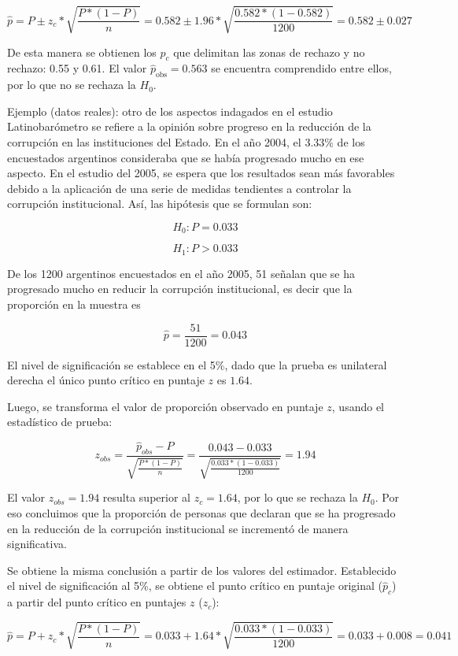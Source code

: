 \documentclass[]{book}
\begin{document}
\[\widehat{p} = P \pm z_{c}*\sqrt{\frac{P*(1 - P)}{n}} = 0.582 \pm 1.96*\sqrt{\frac{0.582*(1 - 0.582)}{1200}} = 0.582 \pm 0.027\]

De esta manera se obtienen los \({\widehat{p}}_{c}\) que delimitan las
zonas de rechazo y no rechazo: 0.55 y 0.61. El valor
\({\widehat{p}}_{\text{obs}} = 0.563\) se encuentra comprendido entre
ellos, por lo que no se rechaza la \(H_{0}\).

Ejemplo (datos reales): otro de los aspectos indagados en el estudio
Latinobarómetro se refiere a la opinión sobre progreso en la reducción de la corrupción
en las instituciones del Estado. En el año 2004, el 3.33\% de los
encuestados argentinos consideraba que se había progresado mucho en ese
aspecto. En el estudio del 2005, se espera que los resultados sean más
favorables debido a la aplicación de una serie de medidas tendientes a
controlar la corrupción institucional. Así, las hipótesis que se
formulan son:

\[H_{0}:P = 0.033\]

\[H_{1}:P > 0.033\]

De los 1200 argentinos encuestados en el año 2005, 51 señalan que se ha
progresado mucho en reducir la corrupción institucional, es decir que la
proporción en la muestra es

\[\widehat{p} = \frac{51}{1200} = 0.043\]

El nivel de significación se establece en el 5\%, dado que la prueba es
unilateral derecha el único punto crítico en puntaje \(z\) es \(1.64\).

Luego, se transforma el valor de proporción observado en puntaje \(z\),
usando el estadístico de prueba:

\[z_{obs} = \frac{{\widehat{p}}_{obs} - P}{\sqrt{\frac{P*(1 - P)}{n}}} = \frac{0.043 - 0.033}{\sqrt{\frac{0.033*(1 - 0.033)}{1200}}} = 1.94\]

El valor \(z_{obs}=1.94\) resulta superior al \(z_{c}=1.64\), por lo que
se rechaza la \(H_0\). Por eso concluimos que la proporción de personas que
declaran que se ha progresado en la reducción de la corrupción
institucional se incrementó de manera significativa.

Se obtiene la misma conclusión a partir de los valores del estimador.
Establecido el nivel de significación al 5\%, se obtiene el punto crítico
en puntaje original (\({\widehat{p}}_{c}\)) a partir del punto crítico en
puntajes \(z\) (\(z_{c}\)):

\[\widehat{p} = P + z_{c}*\sqrt{\frac{P*(1 - P)}{n}} = 0.033 + 1.64*\sqrt{\frac{0.033*(1 - 0.033)}{1200}} = 0.033 + 0.008 = 0.041\]
\end{document}
